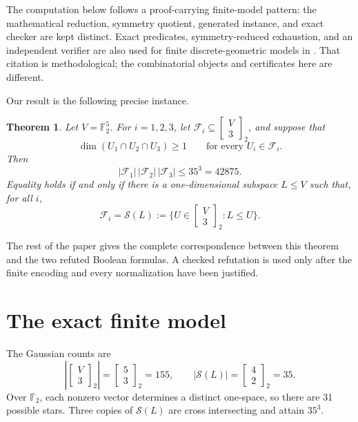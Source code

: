 \documentclass[11pt]{article}
\newtheorem{theorem}{Theorem}
\newcommand{\F}{\mathbb F}
\newcommand{\cF}{\mathcal F}
\newcommand{\cS}{\mathcal S}
\begin{document}
The computation below follows a proof-carrying finite-model pattern: the
mathematical reduction, symmetry quotient, generated instance, and exact
checker are kept distinct.  Exact predicates, symmetry-reduced exhaustion,
and an independent verifier are also used for finite discrete-geometric
models in \cite{ZengEtAl2026}.  That citation is methodological; the
combinatorial objects and certificates here are different.

Our result is the following precise instance.

\begin{theorem}\label{thm:main}
Let $V=\F_2^5$.  For $i=1,2,3$, let
$\cF_i\subseteq \left[\begin{smallmatrix}V\\3\end{smallmatrix}\right]_2$, and suppose that
\[
 \dim(U_1\cap U_2\cap U_3)\geq 1
 \qquad\text{for every }U_i\in\cF_i.
\]
Then
\[
 |\cF_1|\,|\cF_2|\,|\cF_3|\leq 35^3=42875.
\]
Equality holds if and only if there is a one-dimensional subspace $L\leq V$
such that, for all $i$,
\[
 \cF_i=\cS(L):=\{U\in \left[\begin{smallmatrix}V\\3\end{smallmatrix}\right]_2:L\leq U\}.
\]
\end{theorem}

The rest of the paper gives the complete correspondence between this theorem
and the two refuted Boolean formulas.  A checked refutation is used only
after the finite encoding and every normalization have been justified.

\section{The exact finite model}

The Gaussian counts are
\[
 |\left[\begin{smallmatrix}V\\3\end{smallmatrix}\right]_2|=\left[\begin{smallmatrix}5\\3\end{smallmatrix}\right]_2=155,
 \qquad
 |\cS(L)|=\left[\begin{smallmatrix}4\\2\end{smallmatrix}\right]_2=35.
\]
Over $\F_2$, each nonzero vector determines a distinct one-space, so there are
31 possible stars.  Three copies of $\cS(L)$ are cross intersecting and attain
$35^3$.
\end{document}
